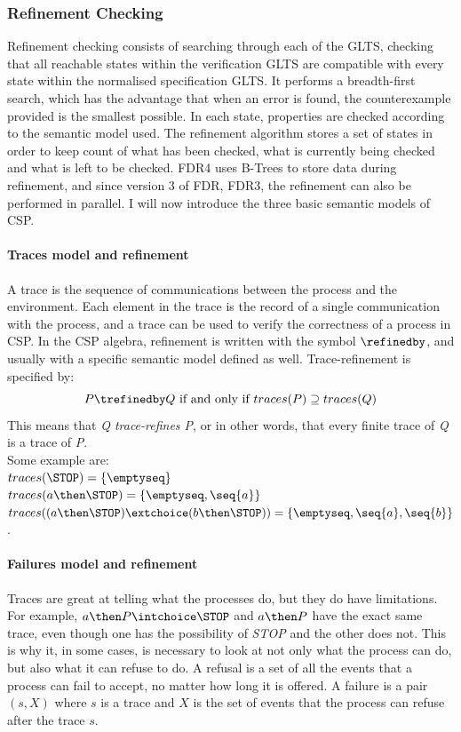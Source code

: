 \subsubsection{Refinement Checking}
\label{sec:refinement}
Refinement checking consists of searching through each of the GLTS, checking that all reachable states within the verification GLTS are compatible with every state within the normalised specification GLTS. It performs a breadth-first search, which has the advantage that when an error is found, the counterexample provided is the smallest possible. In each state, properties are checked according to the semantic model used. The refinement algorithm stores a set of states in order to keep count of what has been checked, what is currently being checked and what is left to be checked. FDR4 uses B-Trees to store data during refinement, and since version 3 of FDR, FDR3, the refinement can also be performed in parallel.
I will now introduce the three basic semantic models of CSP.
\paragraph{Traces model and refinement}
A trace is the sequence of communications between the process and the environment. Each element in the trace is the record of a single communication with the process, and a trace can be used to verify the correctness of a process in CSP. In the CSP algebra, refinement is written with the symbol $\refinedby$, and usually with a specific semantic model defined as well. Trace-refinement is specified by:
$$P \trefinedby Q \text{ if and only if } traces(P) \supseteq traces(Q)$$
This means that \textit{Q trace-refines P}, or in other words, that every finite trace of \textit{Q} is a trace of \textit{P}. \\
Some example are:\\
$traces(\STOP) = \{\emptyseq\}$\\
$traces(a \then \STOP) = \{\emptyseq, \seq{a}\}$\\
$traces((a \then \STOP)\extchoice (b \then \STOP)) = \{\emptyseq, \seq{a}, \seq{b}\}$.
\paragraph{Failures model and refinement}
Traces are great at telling what the processes do, but they do have limitations. For example, $a \then P \intchoice \STOP$ and $a \then P$ have the exact same trace, even though one has the possibility of \textit{STOP} and the other does not. This is why it, in some cases, is necessary to look at not only what the process can do, but also what it can refuse to do. A refusal is a set of all the events that a process can fail to accept, no matter how long it is offered. A failure is a pair $(s, X)$ where $s$ is a trace and $X$ is the set of events that the process can refuse after the trace $s$.\\

